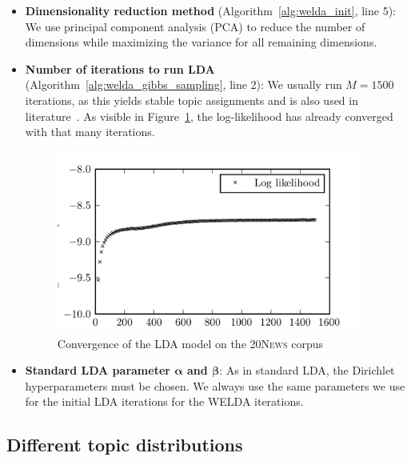 \documentclass[
        a4paper,
        titlepage,
        twoside,
        parskip,
        numbers=noenddot
        ]{scrbook}
\theoremstyle{break}
\begin{document}
\begin{itemize}
  \item \textbf{Dimensionality reduction method} (Algorithm~\ref{alg:welda_init}, line 5):
    We use principal component analysis (PCA) to reduce the number of dimensions while maximizing the variance for all remaining dimensions.
  \item \textbf{Number of iterations to run LDA} (Algorithm~\ref{alg:welda_gibbs_sampling}, line 2):
    We usually run $M = 1500$ iterations, as this yields stable topic assignments and is also used in literature~\cite{Nguyen2015}.
    As visible in Figure~\ref{fig:ll_lda_convergence}, the log-likelihood has already converged with that many iterations.
    \begin{figure}
           \centering
           \includegraphics[width=10cm]{figures/ll_lda_convergence.png}
           \caption{Convergence of the LDA model on the \textsc{20News} corpus}
           \label{fig:ll_lda_convergence}
    \end{figure}
  \item \textbf{Standard LDA parameter $\boldsymbol{\alpha}$ and $\boldsymbol{\beta}$}:
    As in standard LDA, the Dirichlet hyperparameters must be chosen.
    We always use the same parameters we use for the initial LDA iterations for the WELDA iterations.
\end{itemize}

\subsection{Different topic distributions}
\end{document}
